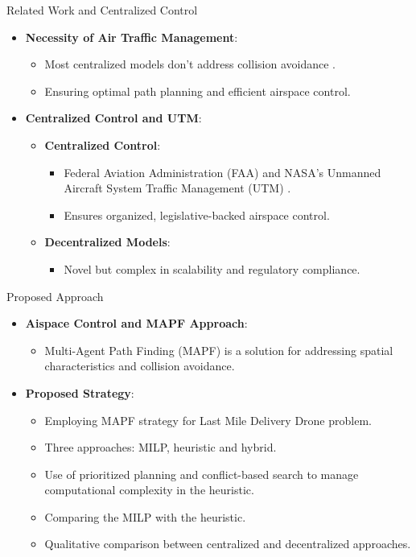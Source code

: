 \begin{frame}{Related Work and Centralized Control}
\begin{itemize}
    \item \textbf{Necessity of Air Traffic Management}:
    \begin{itemize}
        \item Most centralized models don't address collision avoidance \cite{DUKKANCI2023}.
        \item Ensuring optimal path planning and efficient airspace control.
    \end{itemize}
    \item \textbf{Centralized Control and UTM}:
    \begin{itemize}
        \item \textbf{Centralized Control}:
        \begin{itemize}
            \item Federal Aviation Administration (FAA) and NASA's Unmanned Aircraft System Traffic Management (UTM) \cite{nasa}.
            \item Ensures organized, legislative-backed airspace control.
        \end{itemize}
        \item \textbf{Decentralized Models}:
        \begin{itemize}
            \item Novel but complex in scalability and regulatory compliance.
        \end{itemize}
    \end{itemize}
\end{itemize}
\end{frame}


\begin{frame}{Proposed Approach}
\begin{itemize}
    \item \textbf{Aispace Control and MAPF Approach}:
    \begin{itemize}
        \item Multi-Agent Path Finding (MAPF) is a solution for addressing spatial characteristics and collision avoidance.
    \end{itemize}
    \item \textbf{Proposed Strategy}:
    \begin{itemize}
        \item Employing MAPF strategy for Last Mile Delivery Drone problem.
        \item Three approaches: MILP, heuristic and hybrid.
        \item Use of prioritized planning \cite{7138650} and conflict-based search \cite{SHARON201540} to manage computational complexity in the heuristic.
        \item Comparing the MILP with the heuristic.
        \item Qualitative comparison between centralized and decentralized approaches.
    \end{itemize}
\end{itemize}
\end{frame}


